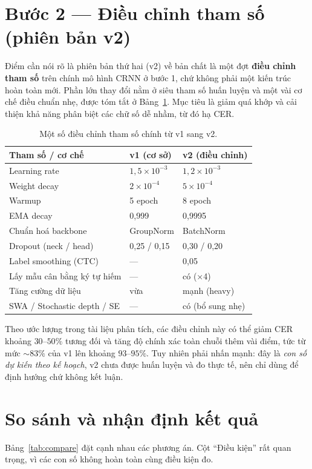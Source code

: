 \documentclass[12pt,a4paper]{report}
\begin{document}
\section{Bước 2 --- Điều chỉnh tham số (phiên bản v2)}
Điểm cần nói rõ là phiên bản thứ hai (v2) về bản chất là một đợt \textbf{điều chỉnh tham số} trên chính mô hình CRNN ở bước 1, chứ không phải một kiến trúc hoàn toàn mới. Phần lớn thay đổi nằm ở siêu tham số huấn luyện và một vài cơ chế điều chuẩn nhẹ, được tóm tắt ở Bảng~\ref{tab:v2}. Mục tiêu là giảm quá khớp và cải thiện khả năng phân biệt các chữ số dễ nhầm, từ đó hạ CER.

\begin{table}[H]
\centering
\caption{Một số điều chỉnh tham số chính từ v1 sang v2.}
\label{tab:v2}
\begin{tabular}{p{4.6cm}p{3.0cm}p{3.0cm}}
\toprule
\textbf{Tham số / cơ chế} & \textbf{v1 (cơ sở)} & \textbf{v2 (điều chỉnh)} \\
\midrule
Learning rate & $1{,}5\times10^{-3}$ & $1{,}2\times10^{-3}$ \\
Weight decay & $2\times10^{-4}$ & $5\times10^{-4}$ \\
Warmup & 5 epoch & 8 epoch \\
EMA decay & 0,999 & 0,9995 \\
Chuẩn hoá backbone & GroupNorm & BatchNorm \\
Dropout (neck / head) & 0,25 / 0,15 & 0,30 / 0,20 \\
Label smoothing (CTC) & --- & 0,05 \\
Lấy mẫu cân bằng ký tự hiếm & --- & có (×4) \\
Tăng cường dữ liệu & vừa & mạnh (heavy) \\
SWA / Stochastic depth / SE & --- & có (bổ sung nhẹ) \\
\bottomrule
\end{tabular}
\end{table}

Theo ước lượng trong tài liệu phân tích, các điều chỉnh này có thể giảm CER khoảng $30$--$50\%$ tương đối và tăng độ chính xác toàn chuỗi thêm vài điểm, tức từ mức $\sim$$83\%$ của v1 lên khoảng $93$--$95\%$. Tuy nhiên phải nhấn mạnh: đây là \emph{con số dự kiến theo kế hoạch}, v2 chưa được huấn luyện và đo thực tế, nên chỉ dùng để định hướng chứ không kết luận.

\section{So sánh và nhận định kết quả}
Bảng~\ref{tab:compare} đặt cạnh nhau các phương án. Cột ``Điều kiện'' rất quan trọng, vì các con số không hoàn toàn cùng điều kiện đo.
\end{document}
